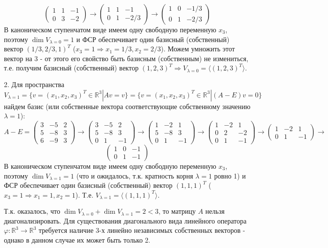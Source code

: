 \documentclass{article}
\begin{document}
$$\left(\begin{array}{rrr}1 & 1 & -1\\0 & 3 & -2\end{array}\right)\rightarrow\left(\begin{array}{rrr}1 & 1 & -1\\0 & 1 & -2/3\end{array}\right)\rightarrow\left(\begin{array}{rrr}1 & 0 & -1/3\\0 & 1 & -2/3\end{array}\right)$$
В каноническом ступенчатом виде имеем одну свободную переменную $x_3$, поэтому $\dim V_{\lambda=0}=1$ и ФСР обеспечивает один базисный (собственный) вектор $(1/3, 2/3, 1)^T$  ($x_3=1\Rightarrow x_1=1/3, x_2=2/3$). Можем умножить этот вектор на 3 - от этого его свойство быть базисным (собственным) не измениться, т.е. получим базисный (собственный) вектор $(1, 2, 3)^T \Rightarrow V_{\lambda=0} = \langle(1, 2, 3)^T\rangle$.
\par
2. Для пространства $V_{\lambda=1}=\{v=(x_1,x_2,x_3)^T\in\mathbb{R}^3|Av = v\}=\{v=(x_1,x_2,x_3)^T\in\mathbb{R}^3|(A-E)v = 0\}$ найдем базис (или собственные вектора соответствующие собственному значению $\lambda=1$):
$$A-E=\left(\begin{array}{rrr}3 & -5 & 2\\5 & -8 & 3\\6 & -9 & 3\end{array}\right)\rightarrow\left(\begin{array}{rrr}3 & -5 & 2\\5 & -8 & 3\\0 & 1 & -1\end{array}\right)\rightarrow\left(\begin{array}{rrr}1 & -2 & 1\\5 & -8 & 3\\0 & 1 & -1\end{array}\right)\rightarrow\left(\begin{array}{rrr}1 & -2 & 1\\0 & 2 & -2\\0 & 1 & -1\end{array}\right)\rightarrow\left(\begin{array}{rrr}1 & -2 & 1\\0 & 1 & -1\end{array}\right)\rightarrow$$
$$\left(\begin{array}{rrr}1 & 0 & -1\\0 & 1 & -1\end{array}\right)$$
В каноническом ступенчатом виде имеем одну свободную переменную $x_3$, поэтому $\dim V_{\lambda=1}=1$ (что и ожидалось, т.к. кратность корня $\lambda=1$ ровно 1) и ФСР обеспечивает один базисный (собственный) вектор $(1, 1, 1)^T$  ($x_3=1\Rightarrow x_1=1, x_2=1$). Т.е. $V_{\lambda=1} = \langle(1, 1, 1)^T\rangle$.
\par
Т.к. оказалось, что $\dim V_{\lambda=0} + \dim V_{\lambda=1} = 2 < 3$, то матрицу $A$ нельзя диагонализировать. Для существования диагонального вида линейного оператора $\varphi:\mathbb{R}^3\rightarrow\mathbb{R}^3$ требуется наличие 3-х линейно независимых собственных векторов - однако в данном случае их может быть только 2.
\end{document}
